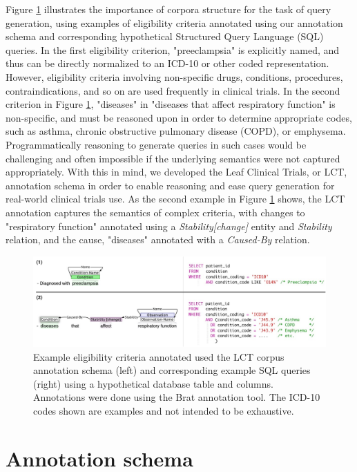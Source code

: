 \documentclass[../main.tex]{subfiles}
\begin{document}
Figure \ref{fig_lct_text2sql} illustrates the importance of corpora structure for the task of query generation, using examples of eligibility criteria annotated using our annotation schema and corresponding hypothetical Structured Query Language (SQL) queries. In the first eligibility criterion, "preeclampsia" is explicitly named, and thus can be directly normalized to an ICD-10 or other coded representation. However, eligibility criteria involving non-specific drugs, conditions, procedures, contraindications, and so on are used frequently in clinical trials. In the second criterion in Figure \ref{fig_lct_text2sql}, "diseases" in "diseases that affect respiratory function" is non-specific, and must be reasoned upon in order to determine appropriate codes, such as asthma, chronic obstructive pulmonary disease (COPD), or emphysema.  Programmatically reasoning to generate queries in such cases would be challenging and often impossible if the underlying semantics were not captured appropriately. With this in mind, we developed the Leaf Clinical Trials, or LCT, annotation schema in order to enable reasoning and ease query generation for real-world clinical trials use. As the second example in Figure \ref{fig_lct_text2sql} shows, the LCT annotation captures the semantics of complex criteria, with changes to "respiratory function" annotated using a \textit{Stability[change]} entity and \textit{Stability} relation, and the cause, "diseases" annotated with a \textit{Caused-By} relation.

\begin{figure}[h!]
  \includegraphics[scale=0.54]{Figures/3_lct_corpus/text2sql.pdf}  
  \caption{Example eligibility criteria annotated used the LCT corpus annotation schema (left) and corresponding example SQL queries (right) using a hypothetical database table and columns. Annotations were done using the Brat annotation tool. The ICD-10 codes shown are examples and not intended to be exhaustive.}
  \label{fig_lct_text2sql}
\end{figure}

\section{Annotation schema}
\end{document}
